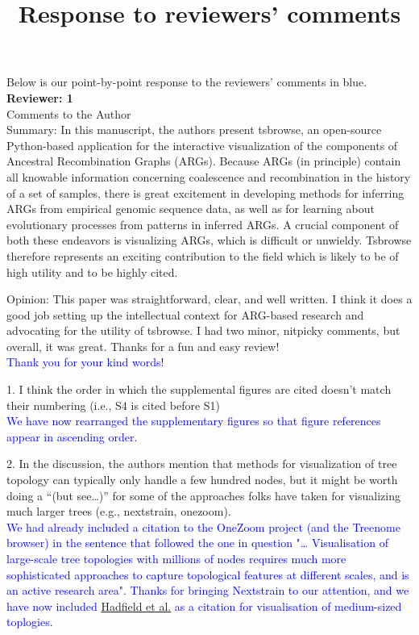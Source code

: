\documentclass{article}
\title{Response to reviewers' comments}
\begin{document}
\maketitle

Below is our point-by-point response to the reviewers' comments in blue.\\

\textbf{Reviewer: 1}\\

Comments to the Author \\

Summary: In this manuscript, the authors present tsbrowse, an open-source Python-based 
application for the interactive visualization of the components of Ancestral Recombination 
Graphs (ARGs). Because ARGs (in principle) contain all knowable information concerning 
coalescence and recombination in the history of a set of samples, there is great excitement 
in developing methods for inferring ARGs from empirical genomic sequence data, as well as 
for learning about evolutionary processes from patterns in inferred ARGs. A crucial component 
of both these endeavors is visualizing ARGs, which is difficult or unwieldy. Tsbrowse therefore 
represents an exciting contribution to the field which is likely to be of high utility and 
to be highly cited.

Opinion: This paper was straightforward, clear, and well written. I think it does a good job 
setting up the intellectual context for ARG-based research and advocating for the utility of 
tsbrowse. I had two minor, nitpicky comments, but overall, it was great. Thanks for a fun and 
easy review!\\
\textcolor{blue}{Thank you for your kind words!}

1. I think the order in which the supplemental figures are cited doesn’t match their numbering 
(i.e., S4 is cited before S1)\\
\textcolor{blue}{We have now rearranged the supplementary figures so that figure references 
appear in ascending order.}

2. In the discussion, the authors mention that methods for visualization of tree topology can 
typically only handle a few hundred nodes, but it might be worth doing a ``(but see…)'' for some 
of the approaches folks have taken for visualizing much larger trees (e.g., nextstrain, onezoom).\\
\textcolor{blue}{We had already included a citation to the OneZoom project (and the Treenome browser) in the 
sentence that followed the one in question "… Visualisation of large-scale tree topologies with millions of nodes 
requires much more sophisticated approaches to capture topological features at different scales, 
and is an active research area". Thanks for bringing Nextstrain to our 
attention, and we have now included \href{{https://academic.oup.com/bioinformatics/article/34/23/4121/5001388}}{Hadfield et al.} 
as a citation for visualisation of medium-sized toplogies.}\\
\end{document}
